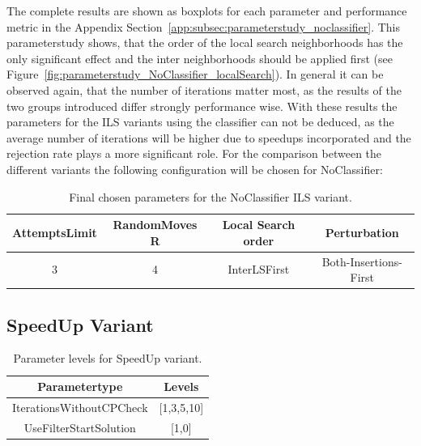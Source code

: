 The complete results are shown as boxplots for each parameter and performance metric in the Appendix Section~\ref{app:subsec:parameterstudy_noclassifier}.
This parameterstudy shows, that the order of the local search neighborhoods has the only significant effect and the inter neighborhoods
should be applied first (see Figure~\ref{fig:parameterstudy_NoClassifier_localSearch}). In general it can be observed again, that
the number of iterations matter most, as the results of the two groups introduced differ strongly performance wise. With these results
the parameters for the \gls{ILS} variants using the classifier can not be deduced, as the average number of iterations will be higher due to
speedups incorporated and the rejection rate plays a more significant role. For the comparison between the different variants the following
configuration will be chosen for NoClassifier:

\begin{table}[ht]
    \centering
    \begin{tabular}{@{}cccc@{}}
        \toprule
        AttemptsLimit & RandomMoves        R & Local Search order & Perturbation          \\
        \midrule
        3             & 4                    & InterLSFirst       & Both-Insertions-First \\
        \bottomrule
    \end{tabular}
    \caption{Final chosen parameters for the NoClassifier ILS variant.}
    \label{tab:parameters_final_noclassifier}
\end{table}

\subsection{SpeedUp Variant}
\label{subsec_parameterStuy_speedup}

\begin{table}[ht]
    \centering
    \begin{tabular}{c c }
        \toprule
        Parametertype            & Levels     \\
        \midrule
        IterationsWithoutCPCheck & [1,3,5,10] \\
        UseFilterStartSolution   & [1,0]      \\
        \bottomrule
    \end{tabular}
    \caption{Parameter levels for SpeedUp variant.}
    \label{tab:parameters_speedup}
\end{table}

